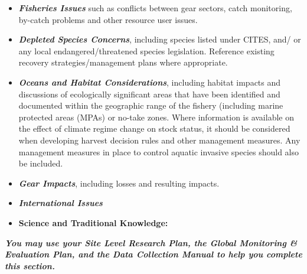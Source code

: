 \documentclass[]{book}
\providecommand{\tightlist}{%
  \setlength{\itemsep}{0pt}\setlength{\parskip}{0pt}}
\begin{document}
\begin{itemize}
  \begin{itemize}
  \item
    \textbf{\emph{Fisheries Issues}} such as conflicts between gear
    sectors, catch monitoring, by-catch problems and other resource user
    issues.
  \item
    \textbf{\emph{Depleted Species Concerns}}, including species listed
    under CITES, and/ or any local endangered/threatened species
    legislation. Reference existing recovery strategies/management plans
    where appropriate.
  \item
    \textbf{\emph{Oceans and Habitat Considerations}}, including habitat
    impacts and discussions of ecologically significant areas that have
    been identified and documented within the geographic range of the
    fishery (including marine protected areas (MPAs) or no-take zones.
    Where information is available on the effect of climate regime
    change on stock status, it should be considered when developing
    harvest decision rules and other management measures. Any management
    measures in place to control aquatic invasive species should also be
    included.
  \item
    \textbf{\emph{Gear Impacts}}, including losses and resulting
    impacts.
  \item
    \textbf{\emph{International Issues}}
  \end{itemize}
\end{itemize}

\begin{itemize}
\tightlist
\item
  \textbf{Science and Traditional Knowledge:}
\end{itemize}

\textbf{\emph{You may use your Site Level Research Plan, the Global
Monitoring \& Evaluation Plan, and the Data Collection Manual to help
you complete this section.}}
\end{document}
